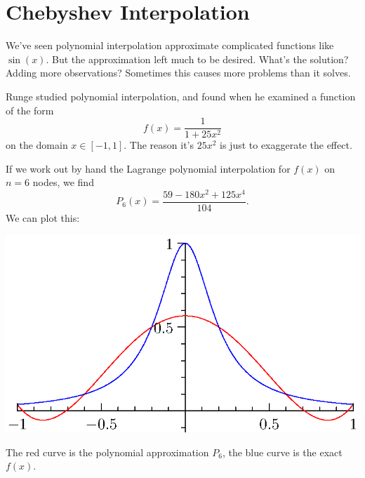 \section{Chebyshev Interpolation}

We've seen polynomial interpolation approximate complicated functions
like $\sin(x)$. But the approximation left much to be desired. What's
the solution? Adding more observations? Sometimes this causes more
problems than it solves.

\begin{ex}
  Runge studied polynomial interpolation, and found when he examined a
  function of the form
  \begin{equation}
    f(x) = \frac{1}{1 + 25x^{2}}
  \end{equation}
  on the domain $x\in[-1,1]$. The reason it's $25x^2$ is just to
  exaggerate the effect.

  If we work out by hand the Lagrange polynomial interpolation for
  $f(x)$ on $n=6$ nodes, we find
  \begin{equation}
    P_{6}(x) = \frac{59 - 180 x^{2} + 125 x^{4}}{104}.
  \end{equation}
  We can plot this:
  \begin{center}
    \includegraphics{img/chebyshev.eps}
  \end{center}
  The red curve is the polynomial approximation $P_{6}$, the blue curve
  is the exact $f(x)$.


\end{ex}
